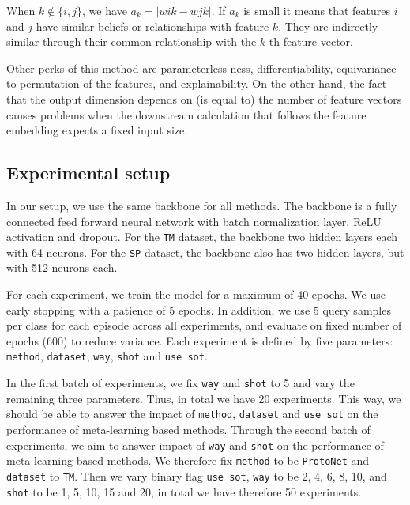 \documentclass{article}
\begin{document}
When $k \notin \{i,j\}$, we have $a_k = |wik - wjk|$. If $a_k$ is small it means that features $i$ and $j$ have similar beliefs or relationships with feature $k$. They are indirectly similar through their common relationship with the $k$-th feature vector.

Other perks of this method are parameterless-ness, differentiability, equivariance to permutation of the features, and explainability. On the other hand, the fact that the output dimension depends on (is equal to) the number of feature vectors causes problems when the downstream calculation that follows the feature embedding expects a fixed input size.

\subsection{Experimental setup}
In our setup, we use the same backbone for all methods. The backbone is a fully connected feed forward neural network with batch normalization
layer, ReLU activation and dropout. For the \texttt{TM} dataset, the backbone two hidden layers each with 64 neurons. For the \texttt{SP} dataset,
the backbone also has two hidden layers, but with 512 neurons each. 

For each experiment, we train the model for a maximum of 40 epochs. We use early stopping with a patience of 5 epochs. In addition, we use 5 query samples per class for each episode across all experiments, and evaluate on fixed number of epochs (600) to reduce variance.  Each experiment is defined by five parameters: \texttt{method}, \texttt{dataset}, \texttt{way}, \texttt{shot} and \texttt{use sot}.

In the first batch of experiments, we fix \texttt{way} and \texttt{shot} to 5 and vary the remaining three parameters. Thus, in total we have 20 experiments. 
This way, we should be able to answer the impact of \texttt{method}, \texttt{dataset} and \texttt{use sot} on the performance of meta-learning based methods.
Through the second batch of experiments, we aim to answer impact of \texttt{way} and \texttt{shot} on the performance of meta-learning based methods.
We therefore fix \texttt{method} to be \texttt{ProtoNet} and \texttt{dataset} to \texttt{TM}. Then we vary binary flag \texttt{use sot}, \texttt{way} to be 2, 4, 6, 8, 10, and \texttt{shot} to be 1, 5, 10, 15 and 20, in total we have therefore 50 experiments.

\end{document}
